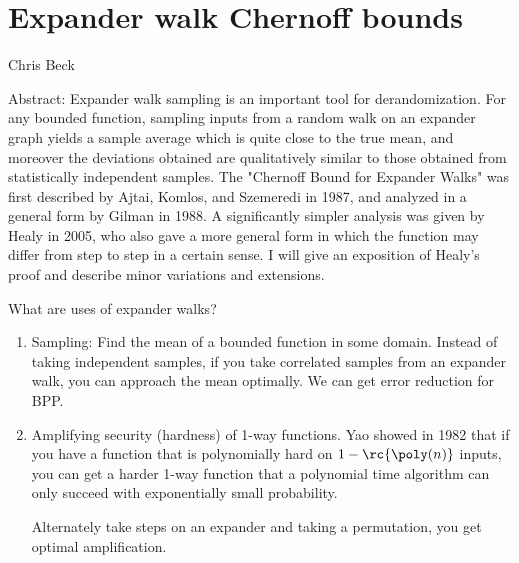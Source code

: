 \def\filepath{C:/Users/Owner/Dropbox/Math/templates}





%


%

\pagestyle{fancy}
\lhead{}
\chead{} 
\rhead{} 
\lfoot{} 
\cfoot{\thepage} 
\rfoot{} 
\renewcommand{\headrulewidth}{.3pt} 
\setlength\voffset{0in}
\setlength\textheight{648pt}


\section{Expander walk Chernoff bounds}

Chris Beck

Abstract: Expander walk sampling is an important tool for derandomization. For any bounded function, sampling inputs from a random walk on an expander graph yields a sample average which is quite close to the true mean, and moreover the deviations obtained are qualitatively similar to those obtained from statistically independent samples. The "Chernoff Bound for Expander Walks" was first described by Ajtai, Komlos, and Szemeredi in 1987, and analyzed in a general form by Gilman in 1988. A significantly simpler analysis was given by Healy in 2005, who also gave a more general form in which the function may differ from step to step in a certain sense. I will give an exposition of Healy's proof and describe minor variations and extensions.

What are uses of expander walks?
\begin{enumerate}
\item
Sampling: Find the mean of a bounded function in some domain. 
Instead of taking independent samples, if you take correlated samples from an expander walk, you can approach the mean optimally. We can get error reduction for BPP.
\item
Amplifying security (hardness) of 1-way functions.
Yao showed in 1982 that if you have a function that is polynomially hard on $1-\rc{\poly(n)}$ inputs, you can get a harder 1-way function that a polynomial time algorithm can only succeed with exponentially small probability.

Alternately take steps on an expander and taking a permutation, you get optimal amplification.
\end{enumerate}

